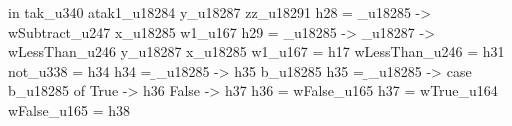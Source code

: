                                                                                                                                                                                               in tak_u340 atak1_u18284 y_u18287 zz_u18291
                                                                                                                                                h28 = \x_u18285 -> wSubtract_u247 x_u18285 w1_u167
                                                                                                                                                h29 = \x_u18285 -> \y_u18287 -> wLessThan_u246 y_u18287 x_u18285
                                                                                                                                                w1_u167 = h17
                                                                                                                                                wLessThan_u246 = h31
                                                                                                                                                not_u338 = h34
                                                                                                                                                h34 = \b_u18285 -> h35 b_u18285
                                                                                                                                                h35 = \b_u18285 -> case b_u18285 of
                                                                                                                                                                     True ->
                                                                                                                                                                       h36
                                                                                                                                                                     False ->
                                                                                                                                                                       h37
                                                                                                                                                h36 = wFalse_u165
                                                                                                                                                h37 = wTrue_u164
                                                                                                                                                wFalse_u165 = h38
